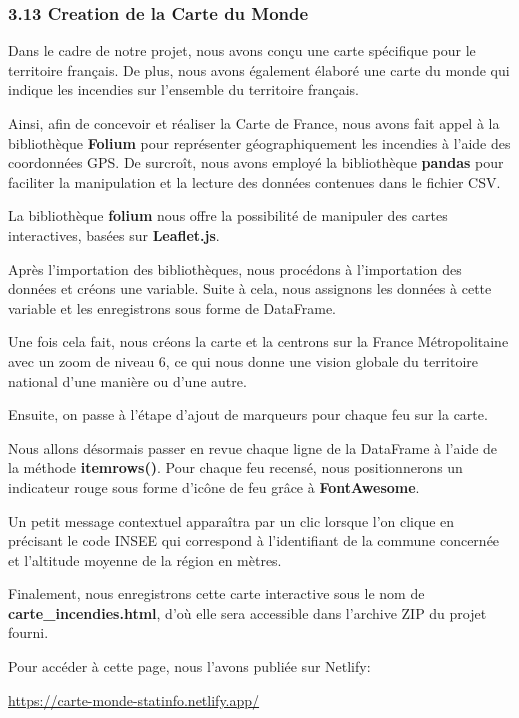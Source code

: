 \documentclass[
]{article}
\begin{document}
\subsubsection{3.13 Creation de la Carte du
Monde}\label{creation-de-la-carte-du-monde}

Dans le cadre de notre projet, nous avons conçu une carte spécifique
pour le territoire français. De plus, nous avons également élaboré une
carte du monde qui indique les incendies sur l'ensemble du territoire
français.

Ainsi, afin de concevoir et réaliser la Carte de France, nous avons fait
appel à la bibliothèque \textbf{Folium} pour représenter
géographiquement les incendies à l'aide des coordonnées GPS. De
surcroît, nous avons employé la bibliothèque \textbf{pandas} pour
faciliter la manipulation et la lecture des données contenues dans le
fichier CSV.

La bibliothèque \textbf{folium} nous offre la possibilité de manipuler
des cartes interactives, basées sur \textbf{Leaflet.js}.

Après l'importation des bibliothèques, nous procédons à l'importation
des données et créons une variable. Suite à cela, nous assignons les
données à cette variable et les enregistrons sous forme de DataFrame.

Une fois cela fait, nous créons la carte et la centrons sur la France
Métropolitaine avec un zoom de niveau 6, ce qui nous donne une vision
globale du territoire national d'une manière ou d'une autre.

Ensuite, on passe à l'étape d'ajout de marqueurs pour chaque feu sur la
carte.

Nous allons désormais passer en revue chaque ligne de la DataFrame à
l'aide de la méthode \textbf{itemrows()}. Pour chaque feu recensé, nous
positionnerons un indicateur rouge sous forme d'icône de feu grâce à
\textbf{FontAwesome}.

Un petit message contextuel apparaîtra par un clic lorsque l'on clique
en précisant le code INSEE qui correspond à l'identifiant de la commune
concernée et l'altitude moyenne de la région en mètres.

Finalement, nous enregistrons cette carte interactive sous le nom de
\textbf{carte\_incendies.html}, d'où elle sera accessible dans l'archive
ZIP du projet fourni.

Pour accéder à cette page, nous l'avons publiée sur Netlify:

\url{https://carte-monde-statinfo.netlify.app/}
\end{document}
